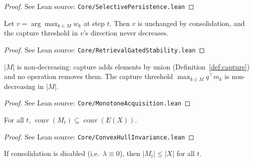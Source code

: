 \begin{proof}
\leanok
{}
See Lean source: \texttt{Core/SelectivePersistence.lean}
\end{proof}

\begin{lemma}
\label{lem:stability}
\leanok
{}
Let $v = \arg\max_{k \in M} w_k$ at step $t$. Then $v$ is unchanged by consolidation, and the capture threshold in $v$'s direction never decreases.
\end{lemma}

\begin{proof}
\leanok
{}
See Lean source: \texttt{Core/RetrievalGatedStability.lean}
\end{proof}

\begin{corollary}
\label{cor:acquisition}
\leanok
{}
$|M|$ is non-decreasing: capture adds elements by union (Definition~\ref{def:capture}) and no operation removes them.  The capture threshold $\max_{k \in M} q^\top m_k$ is non-decreasing in $|M|$.
\end{corollary}

\begin{proof}
\leanok
{}
See Lean source: \texttt{Core/MonotoneAcquisition.lean}
\end{proof}

\begin{lemma}
\label{lem:hull}
\leanok
{}
For all $t$, $\operatorname{conv}(M_t) \subseteq \operatorname{conv}(E(X))$.
\end{lemma}

\begin{proof}
\leanok
{}
See Lean source: \texttt{Core/ConvexHullInvariance.lean}
\end{proof}

\begin{lemma}
\label{lem:finite}
\leanok
{}
If consolidation is disabled (i.e.\ $\lambda \equiv 0$), then $|M_t| \leq |X|$ for all $t$.
\end{lemma}

